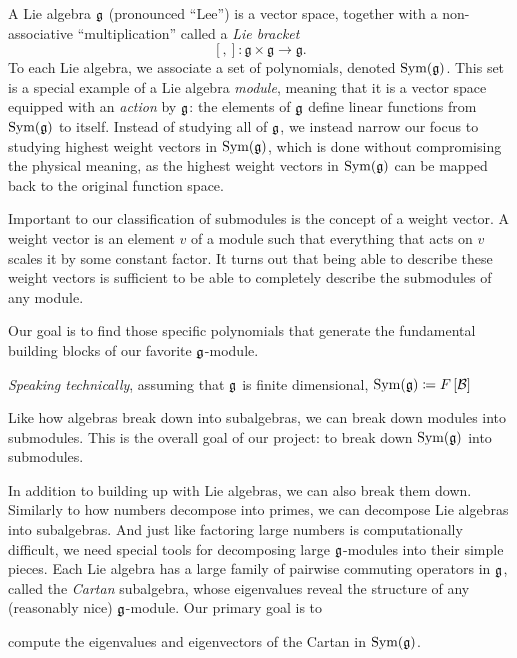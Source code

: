 \documentclass[11pt, reqno]{amsart}
\begin{document}
A Lie algebra $\mathfrak{g}$ (pronounced ``Lee'') is a vector space, together with a non-associative ``multiplication'' called a \emph{Lie bracket}
\[[,]: \mathfrak{g} \times \mathfrak{g} \rightarrow \mathfrak{g}.\]
To each Lie algebra, we associate a set of polynomials, denoted $\operatorname{Sym}(\mathfrak{g})$. This set is a special example of a Lie algebra \emph{module}, meaning that it is a vector space equipped with an \emph{action} by $\mathfrak{g}$: the elements of $\mathfrak{g}$ define linear functions from $\operatorname{Sym}(\mathfrak{g})$ to itself. Instead of studying all of $\mathfrak{g}$, we instead narrow our focus to studying highest weight vectors in $\operatorname{Sym}(\mathfrak{g})$, which is done without compromising the physical meaning, as the highest weight vectors in $\operatorname{Sym}(\mathfrak{g})$ can be mapped back to the original function space. 


Important to our classification of submodules is the concept of a weight vector.
A weight vector is an element $v$ of a module such that everything that acts on
$v$ scales it by some constant factor. It turns out that being able to describe
these weight vectors is sufficient to be able to completely describe the
submodules of any module.


Our goal is to find those specific polynomials that generate the fundamental building blocks of our favorite $\mathfrak{g}$-module.

\emph{Speaking technically}, assuming that $\mathfrak{g}$ is finite dimensional, $\operatorname{Sym}(\mathfrak{g})\coloneqq F\left[ \mathcal{B} \right]$ 

Like how algebras break down into subalgebras, we can break down modules into
submodules. This is the overall goal of our project: to break down $\operatorname{Sym}(\mathfrak{g})$
into submodules.

In addition to building up with Lie algebras, we can also break them down.
Similarly to how numbers decompose into primes, we can decompose Lie algebras into subalgebras. And just like factoring large numbers is computationally difficult, we need special tools for decomposing large $\mathfrak{g}$-modules into their simple pieces. Each Lie algebra has a large family of pairwise commuting operators in $\mathfrak{g}$, called the \emph{Cartan} subalgebra, whose eigenvalues reveal the structure of any (reasonably nice) $\mathfrak{g}$-module. Our primary goal is to
\begin{center} compute the eigenvalues and eigenvectors of the Cartan in $\operatorname{Sym}(\mathfrak{g})$. \end{center}




%
%
\end{document}
